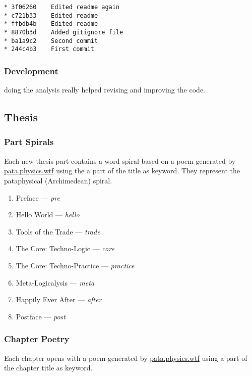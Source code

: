 \begin{verbatim}
* 3f06260	 Edited readme again
* c721b33	 Edited readme
* ffbdb4b	 Edited readme
* 8870b3d	 Added gitignore file
* ba1a9c2	 Second commit
* 244c4b3	 First commit
\end{verbatim}


\subsubsection{Development}

doing the analysis really helped revising and improving the code.



\subsection{Thesis}

\subsubsection{Part Spirals}

Each new thesis part contains a word spiral based on a poem generated by \url{pata.physics.wtf} using the a part of the title as keyword. They represent the pataphysical (Archimedean) spiral.

\begin{enumerate}
  \item Preface --- \emph{pre}
  \item Hello World --- \emph{hello}
  \item Tools of the Trade --- \emph{trade}
  \item The Core: Techno-Logic --- \emph{core}
  \item The Core: Techno-Practice --- \emph{practice}
  \item Meta-Logicalysis --- \emph{meta}
  \item Happily Ever After --- \emph{after}
  \item Postface --- \emph{post}
\end{enumerate}

\subsubsection{Chapter Poetry}

Each chapter opens with a poem generated by \url{pata.physics.wtf} using a part of the chapter title as keyword.

